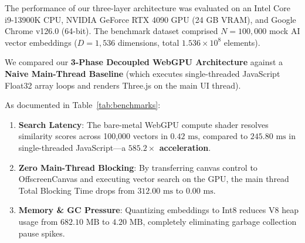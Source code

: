 \documentclass[fleqn,10pt,lineno]{wlpeerj}
\begin{document}
The performance of our three-layer architecture was evaluated on an Intel Core i9-13900K CPU, NVIDIA GeForce RTX 4090 GPU (24 GB VRAM), and Google Chrome v126.0 (64-bit). The benchmark dataset comprised $N = 100,000$ mock AI vector embeddings ($D = 1,536$ dimensions, total $1.536 \times 10^8$ elements).

We compared our \textbf{3-Phase Decoupled WebGPU Architecture} against a \textbf{Naive Main-Thread Baseline} (which executes single-threaded JavaScript Float32 array loops and renders Three.js on the main UI thread).

\begin{table}[ht]
\centering
{}
\caption{\label{tab:benchmarks}Empirical Performance Benchmark Comparison across 100,000 Vector Embeddings ($D=1,536$).}
\end{table}

As documented in Table~\ref{tab:benchmarks}:
\begin{enumerate}[noitemsep]
\item \textbf{Search Latency}: The bare-metal WebGPU compute shader resolves similarity scores across 100,000 vectors in \textbf{$0.42\text{ ms}$}, compared to $245.80\text{ ms}$ in single-threaded JavaScript---a \textbf{$585.2\times$ acceleration}.
\item \textbf{Zero Main-Thread Blocking}: By transferring canvas control to OffscreenCanvas and executing vector search on the GPU, the main thread Total Blocking Time drops from $312.00\text{ ms}$ to \textbf{$0.00\text{ ms}$}.
\item \textbf{Memory \& GC Pressure}: Quantizing embeddings to Int8 reduces V8 heap usage from $682.10\text{ MB}$ to \textbf{$4.20\text{ MB}$}, completely eliminating garbage collection pause spikes.
\end{enumerate}
\end{document}
